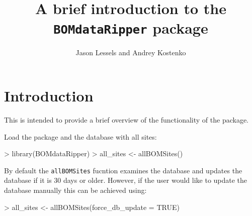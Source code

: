 \documentclass[12pt]{article}
\title{A brief introduction to the \texttt{BOMdataRipper} package}
\author{Jason Lessels and Andrey Kostenko}
\begin{document}


\maketitle

\section{Introduction}
This is intended to provide a brief overview of the functionality of the package.

Load the package and the database with all sites: 

\begin{Schunk}
\begin{Sinput}
> library(BOMdataRipper)
> all_sites <- allBOMSites()
\end{Sinput}
\end{Schunk}

By default the \texttt{allBOMSites} fucntion examines the database and updates the database if it is 30 days or older. However, if the user would like to update the database manually this can be achieved using:

\begin{Schunk}
\begin{Sinput}
> all_sites <- allBOMSites(force_db_update = TRUE)
\end{Sinput}
\end{Schunk}
\end{document}
